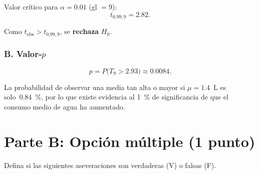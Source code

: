 \documentclass[12pt]{article}
\begin{document}
\begin{enumerate}
	      Valor crítico para $\alpha = 0.01$ (gl $=9$):
	      \[
		      t_{0.99,9} = 2.82.
	      \]

	      Como $t_{\text{obs}} > t_{0.99,9}$, se \textbf{rechaza} $H_0$.

	      \subsubsection*{B. Valor‑$p$}

	      \[
		      p = P\bigl(T_{9} > 2.93\bigr) \approx 0.0084.
	      \]

	      La probabilidad de observar una media tan alta o mayor si $\mu = 1.4$ L es solo 0.84 \%, por lo que existe evidencia al 1 \% de significancia de que el consumo medio de agua ha aumentado.
	      \endgroup
\end{enumerate}

\section*{Parte B: Opción múltiple (1 punto)}

Defina si las siguientes aseveraciones son verdaderas (V) o falsas (F).
\end{document}
